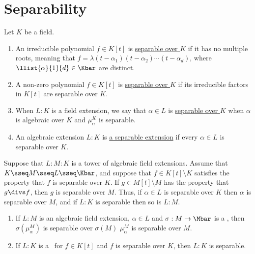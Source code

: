 \documentclass[a4paper]{article}
\begin{document}
\section{Separability}
\begin{tdefinition}[Separable]
  Let \( K \) be a field. \begin{enumerate}[label=(\roman*)]
    \item An irreducible polynomial \( f\in K[t] \) is \ul{separable over \( K \)} if it has no multiple roots, meaning that \( f=\lambda(t-\alpha_1)(t-\alpha_2)\cdots(t-\alpha_d) \), where \( \llist{\alpha}{1}{d}\in \Kbar \) are distinct.
    \item A non-zero polynomial \( f\in K[t] \) is \ul{separable over \( K \)} if its irreducible factors in \( K[t] \) are separable over \( K \).
    \item When \( L:K \) is a field extension, we say that \( \alpha \in L \) is \ul{separable over \( K \)} when \( \alpha \) is algebraic over \( K \) and \( \mu_\alpha^K \) is separable.
    \item An algebraic extension \( L:K \) is \ul{a separable extension} if every \( \alpha\in L \) is separable over \( K \).
  \end{enumerate}
\end{tdefinition}

\begin{tlemma}
  Suppose that \( L:M:K \) is a tower of algebraic field extensions.
  Assume that \( K\sseq M\sseq L\sseq \Kbar \), and suppose that \( f\in K[t]\setminus K \) satisfies the property that \( f \) is separable over \( K \).
  If \( g\in M[t]\setminus M \) has the property that \( g\divs f \), then \( g \) is separable over \( M \).
  Thus, if \( \alpha\in L \) is separable over \( K \) then \( \alpha \) is separable over \( M \), and if \( L:K \) is separable then so is \( L:M \).
\end{tlemma}

\begin{tlemma}
  \begin{enumerate}
    \item If \( L:M \) is an algebraic field extension, \( \alpha\in L \) and \( \sigma:M\to\Mbar \) is a \homo, then \( \sigma(\mu_\alpha^M) \) is separable over \( \sigma(M) \) \iff \( \mu_\alpha^M  \) is separable over \( M \).
    \item If \( L:K \) is a \sfe~for \( f\in K[t] \) and \( f \) is separable over \( K \), then \( L:K \) is separable.
  \end{enumerate}
\end{tlemma}
\end{document}

